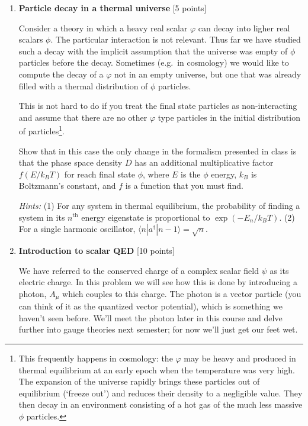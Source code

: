 \documentclass[12pt]{article}
\begin{document}
\begin{enumerate}
\begin{enumerate}
\end{enumerate}


\vspace{1em}

\item{\bf Particle decay in a thermal universe} [5 points]

Consider a theory in which a heavy real scalar $\varphi$ can decay into ligher real scalars  $\phi$. The particular interaction is not relevant. Thus far we have studied such a decay with the implicit assumption that the universe was empty of $\phi$ particles before the decay. Sometimes (e.g.\ in cosmology) we would like to compute the decay of a $\varphi$ not in an empty universe, but one that was already filled with a thermal distribution of $\phi$ particles. 

This is not hard to do if you treat the final state particles as non-interacting and assume that there are no other $\varphi$ type particles in the initial distribution of particles\footnote{This frequently happens in cosmology: the $\varphi$ may be heavy and produced in thermal equilibrium at an early epoch when the temperature was very high. The expansion of the universe rapidly brings these particles out of equilibrium (`freeze out') and reduces their density to a negligible value. They then decay in an environment consisting of a hot gas of the much less massive $\phi$ particles.}.


Show that in this case the only change in the formalism presented in class is that the phase space density $D$ has an additional multiplicative factor $f(E/k_BT)$ for reach final state $\phi$, where $E$ is the $\phi$ energy, $k_B$ is Boltzmann's constant, and $f$ is a function that you must find.

\textit{Hints:} (1) For any system in thermal equilibrium, the probability of finding a system in its $n^\text{th}$ energy eigenstate is proportional to $\exp(-E_n/k_BT)$. (2) For a single harmonic oscillator, $\langle n | a^\dag | n-1 \rangle = \sqrt{n}$.


\vspace{1em}

\item{\bf Introduction to scalar QED} [10 points]

We have referred to the conserved charge of a complex scalar field $\psi$ as its electric charge. In this problem we will see how this is done by introducing a photon, $A_\mu$ which couples to this charge. The photon is a vector particle (you can think of it as the quantized vector potential), which is something we haven't seen before. We'll meet the photon later in this course and delve further into gauge theories next semester; for now we'll just get our feet wet.


\end{enumerate}
\end{document}
